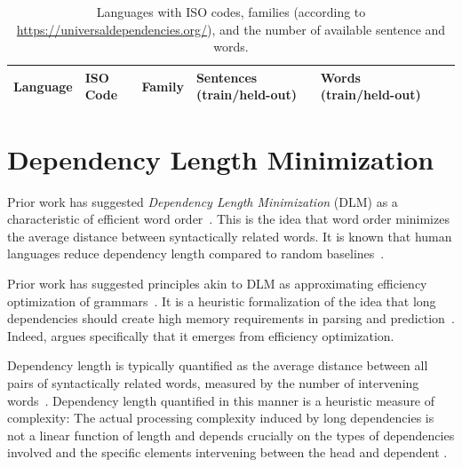 \documentclass[10pt,twoside,lineno]{article}
\begin{document}
\begin{table}[ht]
\small{
\begin{tabular}{lllllll}
Language & ISO Code & Family & Sentences (train/held-out) & Words (train/held-out) \\ \hline

\end{tabular}
}
\caption{Languages with ISO codes, families (according to \url{https://universaldependencies.org/}), and the number of available sentence and words.}\label{tab:langs-iso-sizes}
\end{table}



\section{Dependency Length Minimization}\label{sec:DLM}



Prior work has suggested \emph{Dependency Length Minimization} (DLM) as a characteristic of efficient word order~\cite{futrell2015largescale,liu2017dependency,temperley2018minimizing}.
This is the idea that word order minimizes the average distance between syntactically related words.
It is known that human languages reduce dependency length compared to random baselines~\cite{futrell2015largescale,liu2017dependency,temperley2018minimizing}.

Prior work has suggested principles akin to DLM as approximating efficiency optimization of grammars~\cite{hawkins1994performance,futrell2017memory, futrell2017generalizing}.
It is a heuristic formalization of the idea that long dependencies should create high memory requirements in parsing and prediction~\cite{hawkins1994performance,gibson1998linguistic,gibson2000dependency, futrell2017memory}.
Indeed, \cite{futrell2017memory} argues specifically that it emerges from efficiency optimization.


Dependency length is typically quantified as the average distance between all pairs of syntactically related words, measured by the number of intervening words~\cite{futrell2015largescale}.
Dependency length quantified in this manner is a heuristic measure of complexity:
The actual processing complexity induced by long dependencies is not a linear function of length and depends crucially on the types of dependencies involved \cite{demberg2008data} and the specific elements intervening between the head and dependent \cite{gibson1998linguistic,gibson2000dependency,lewis2005activationbased}.
\end{document}
